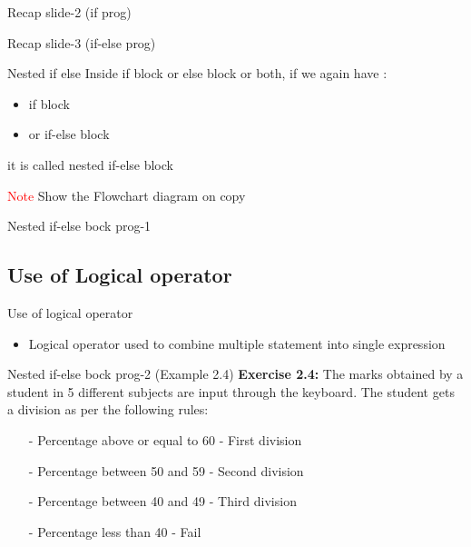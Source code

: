 \documentclass[10pt,a4paper]{beamer}
\begin{document}
    \begin{frame}{Recap slide-2 (if prog) }
             
    \end{frame}
     \begin{frame}{Recap slide-3 (if-else prog)}
             
       
    \end{frame}
    
    \begin{frame}{Nested if else}
    Inside if block or else block or both, if we again have :
    \begin{itemize}
        \item if block 
        \item or if-else block
    \end{itemize}
    it is called nested if-else block
    
    \textcolor{red}{Note} Show the Flowchart diagram on copy
    
    \end{frame}

    \begin{frame}{Nested if-else bock prog-1}
            
        
    \end{frame}
    
    \subsection{ Use of Logical operator}
        \begin{frame}{Use of logical operator}
         
            
        
        \begin{itemize}
            \item Logical operator used to combine multiple statement into single expression
        \end{itemize}
   
        \end{frame}

\begin{frame}{Nested if-else bock prog-2 (Example 2.4)}
    \textbf{Exercise 2.4:}   The marks obtained by a student in 5 different subjects are input through the keyboard. The student gets a division as per the following rules:

    \begin{itemize}
        \item[-] Percentage above or equal to 60 - First division
        \item[-] Percentage between 50 and 59 - Second division
        \item[-] Percentage between 40 and 49 - Third division
        \item[-] Percentage less than 40 - Fail
    \end{itemize}
\end{frame}
    
\end{document}
